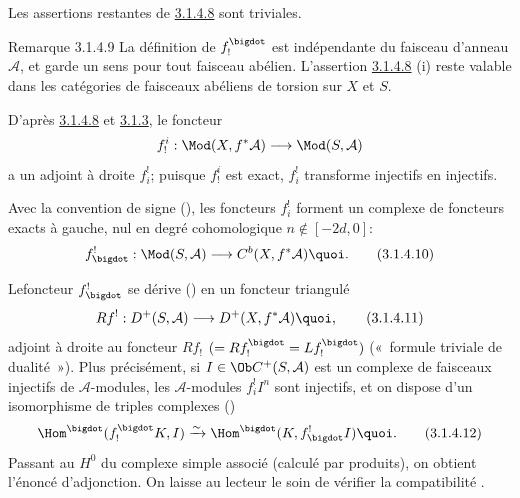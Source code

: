 Les assertions restantes de \hyperref[XVIII.lem3.1.4.8]{3.1.4.8} sont triviales.

\begin{enonce*}[remark]{Remarque 3.1.4.9}
La définition de $f^{\bigdot}_{!}$ est indépendante du faisceau
d'anneau $\mathcal{A}$, et garde un sens pour tout faisceau
abélien. L'assertion \hyperref[XVIII.lem3.1.4.8]{3.1.4.8} (i) reste valable dans les
catégories de faisceaux abéliens de torsion sur $X$ et $S$.
\end{enonce*}

D'après \hyperref[XVIII.lem3.1.4.8]{3.1.4.8} et \hyperref[XVIII.lem3.1.3]{3.1.3}, le foncteur
$$
f^{i}_{!}:\Mod(X,f^{\ast}\mathcal{A})\longrightarrow
\Mod(S,\mathcal{A})
$$
a un adjoint à droite $f^{!}_{i}$; puisque $f^{i}_{!}$ est exact,
$f^{!}_{i}$ transforme injectifs en injectifs.

Avec la convention de signe (), les foncteurs $f^{!}_{i}$
forment un complexe de foncteurs exacts à gauche, nul en degré
cohomologique $n\not\in [-2d,0]$:
\begin{equation*}
f^{!}_{\bigdot}:\Mod(S,\mathcal{A})\longrightarrow
C^{b}(X,f^{\ast}\mathcal{A}){\quoi}.\tag{3.1.4.10}
\end{equation*}

Le\pageoriginale foncteur $f^{!}_{\bigdot}$ se dérive
() en un foncteur triangulé
\begin{equation*}
Rf^{!}:D^{+}(S,\mathcal{A})\longrightarrow
D^{+}(X,f^{\ast}\mathcal{A}){\quoi},\tag{3.1.4.11}
\end{equation*}%
adjoint à droite au foncteur $Rf_{!}$
$(=Rf^{\bigdot}_{!}=Lf^{\bigdot}_{!})$ (« formule triviale de
dualité »). Plus précisément, si $I\in \Ob C^{+}(S,\mathcal{A})$
est un complexe de faisceaux injectifs de $\mathcal{A}$-modules, les
$\mathcal{A}$-modules $f^{!}_{i} I^{n}$ sont injectifs, et on dispose
d'un isomorphisme de triples complexes ()
\begin{equation*}
\Hom^{\bigdot}(f^{\bigdot}_{!}K, I)\xrightarrow{\sim}
\Hom^{\bigdot}(K,f^{!}_{\bigdot}I){\quoi}.\tag{3.1.4.12}
\end{equation*}%
Passant au $H^{0}$ du complexe simple associé (calculé par produits),
on obtient l'énoncé d'adjonction. On laisse au lecteur le soin de
vérifier la compatibilité .

